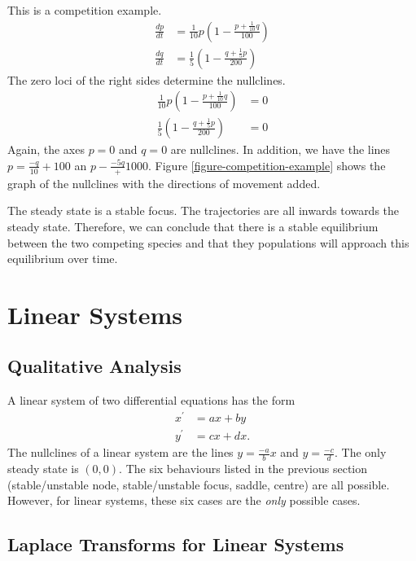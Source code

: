 \documentclass[fleqn,letterpaper]{report}
\begin{document}
\begin{example}
This is a competition example.
\begin{align*}
\frac{dp}{dt} & = \frac{1}{10} p\left(1- \frac{p +
\frac{1}{10}q}{100} \right) \\
\frac{dq}{dt} & = \frac{1}{5} \left(1- \frac{q + \frac{1}{5}
p}{200} \right)
\end{align*}
The zero loci of the right sides determine the nullclines.
\begin{align*}
\frac{1}{10} p\left(1- \frac{p +
\frac{1}{10}q}{100} \right) & = 0 \\
\frac{1}{5} \left(1- \frac{q + \frac{1}{5}
p}{200} \right) & = 0 
\end{align*}
Again, the axes $p=0$ and $q=0$ are nullclines. In addition,
we have the lines $p = \frac{-q}{10} + 100$ an $p - \frac{-5q}
+ 1000$. Figure \ref{figure-competition-example} shows the graph of
the nullclines with the directions of movement added.

The steady state is a stable focus. The trajectories are all
inwards towards the steady state. Therefore, we can conclude
that there is a stable equilibrium between the two competing
species and that they populations will approach this
equilibrium over time.
\end{example}

\section{Linear Systems}
\label{linear-systems}

\subsection{Qualitative Analysis}
\label{qualitative-analysis}

A linear system of two differential equations has the form 
\begin{align*}
x^\prime & = ax + by \\
y^\prime & = cx + dx. 
\end{align*}
The nullclines of a linear system are the lines $y =
\frac{-a}{b} x$ and $y = \frac{-c}{d} $. The only steady
state is $(0,0)$. The six behaviours listed in the previous
section (stable/unstable node, stable/unstable focus, saddle,
centre) are all possible. However, for linear systems,
these six cases are the \emph{only} possible cases. 

\subsection{Laplace Transforms for Linear Systems}
\label{laplace-linear-systems}
\end{document}
